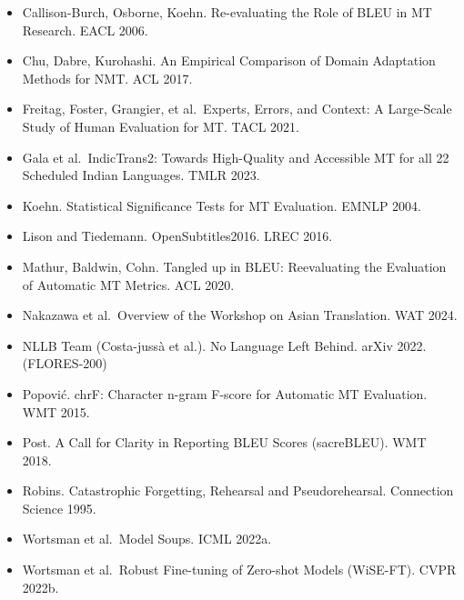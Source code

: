 \documentclass[
  11pt,
]{article}
\providecommand{\tightlist}{%
  \setlength{\itemsep}{0pt}\setlength{\parskip}{0pt}}
\begin{document}
\begin{itemize}
\tightlist
\item
  Callison-Burch, Osborne, Koehn. Re-evaluating the Role of BLEU in MT
  Research. EACL 2006.
\item
  Chu, Dabre, Kurohashi. An Empirical Comparison of Domain Adaptation
  Methods for NMT. ACL 2017.
\item
  Freitag, Foster, Grangier, et al.~Experts, Errors, and Context: A
  Large-Scale Study of Human Evaluation for MT. TACL 2021.
\item
  Gala et al.~IndicTrans2: Towards High-Quality and Accessible MT for
  all 22 Scheduled Indian Languages. TMLR 2023.
\item
  Koehn. Statistical Significance Tests for MT Evaluation. EMNLP 2004.
\item
  Lison and Tiedemann. OpenSubtitles2016. LREC 2016.
\item
  Mathur, Baldwin, Cohn. Tangled up in BLEU: Reevaluating the Evaluation
  of Automatic MT Metrics. ACL 2020.
\item
  Nakazawa et al.~Overview of the Workshop on Asian Translation. WAT
  2024.
\item
  NLLB Team (Costa-jussà et al.). No Language Left Behind. arXiv 2022.
  (FLORES-200)
\item
  Popović. chrF: Character n-gram F-score for Automatic MT Evaluation.
  WMT 2015.
\item
  Post. A Call for Clarity in Reporting BLEU Scores (sacreBLEU). WMT
  2018.
\item
  Robins. Catastrophic Forgetting, Rehearsal and Pseudorehearsal.
  Connection Science 1995.
\item
  Wortsman et al.~Model Soups. ICML 2022a.
\item
  Wortsman et al.~Robust Fine-tuning of Zero-shot Models (WiSE-FT). CVPR
  2022b.
\end{itemize}
\end{document}

